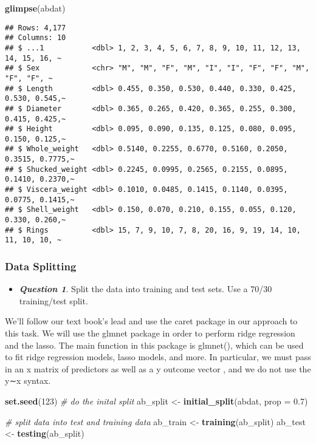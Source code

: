 \documentclass[
]{article}
\newenvironment{Shaded}{\begin{snugshade}}{\end{snugshade}}
\newcommand{\AttributeTok}[1]{\textcolor[rgb]{0.13,0.29,0.53}{#1}}
\newcommand{\CommentTok}[1]{\textcolor[rgb]{0.56,0.35,0.01}{\textit{#1}}}
\newcommand{\DecValTok}[1]{\textcolor[rgb]{0.00,0.00,0.81}{#1}}
\newcommand{\FloatTok}[1]{\textcolor[rgb]{0.00,0.00,0.81}{#1}}
\newcommand{\FunctionTok}[1]{\textcolor[rgb]{0.13,0.29,0.53}{\textbf{#1}}}
\newcommand{\NormalTok}[1]{#1}
\newcommand{\OtherTok}[1]{\textcolor[rgb]{0.56,0.35,0.01}{#1}}
\providecommand{\tightlist}{%
  \setlength{\itemsep}{0pt}\setlength{\parskip}{0pt}}
\begin{document}
\begin{Shaded}
\begin{Highlighting}[]
\FunctionTok{glimpse}\NormalTok{(abdat)}
\end{Highlighting}
\end{Shaded}

\begin{verbatim}
## Rows: 4,177
## Columns: 10
## $ ...1           <dbl> 1, 2, 3, 4, 5, 6, 7, 8, 9, 10, 11, 12, 13, 14, 15, 16, ~
## $ Sex            <chr> "M", "M", "F", "M", "I", "I", "F", "F", "M", "F", "F", ~
## $ Length         <dbl> 0.455, 0.350, 0.530, 0.440, 0.330, 0.425, 0.530, 0.545,~
## $ Diameter       <dbl> 0.365, 0.265, 0.420, 0.365, 0.255, 0.300, 0.415, 0.425,~
## $ Height         <dbl> 0.095, 0.090, 0.135, 0.125, 0.080, 0.095, 0.150, 0.125,~
## $ Whole_weight   <dbl> 0.5140, 0.2255, 0.6770, 0.5160, 0.2050, 0.3515, 0.7775,~
## $ Shucked_weight <dbl> 0.2245, 0.0995, 0.2565, 0.2155, 0.0895, 0.1410, 0.2370,~
## $ Viscera_weight <dbl> 0.1010, 0.0485, 0.1415, 0.1140, 0.0395, 0.0775, 0.1415,~
## $ Shell_weight   <dbl> 0.150, 0.070, 0.210, 0.155, 0.055, 0.120, 0.330, 0.260,~
## $ Rings          <dbl> 15, 7, 9, 10, 7, 8, 20, 16, 9, 19, 14, 10, 11, 10, 10, ~
\end{verbatim}

\hypertarget{data-splitting}{%
\subsubsection{Data Splitting}\label{data-splitting}}

\begin{itemize}
\tightlist
\item
  \textbf{\emph{Question 1}}. Split the data into training and test
  sets. Use a 70/30 training/test split.
\end{itemize}

We'll follow our text book's lead and use the caret package in our
approach to this task. We will use the glmnet package in order to
perform ridge regression and the lasso. The main function in this
package is glmnet(), which can be used to fit ridge regression models,
lasso models, and more. In particular, we must pass in an x matrix of
predictors as well as a y outcome vector , and we do not use the y∼x
syntax.

\begin{Shaded}
\begin{Highlighting}[]
\FunctionTok{set.seed}\NormalTok{(}\DecValTok{123}\NormalTok{)}
\CommentTok{\# do the inital split}
\NormalTok{ab\_split }\OtherTok{\textless{}{-}} \FunctionTok{initial\_split}\NormalTok{(abdat,}
                          \AttributeTok{prop =} \FloatTok{0.7}\NormalTok{)}

\CommentTok{\# split data into test and training data }
\NormalTok{ab\_train }\OtherTok{\textless{}{-}} \FunctionTok{training}\NormalTok{(ab\_split)}
\NormalTok{ab\_test }\OtherTok{\textless{}{-}} \FunctionTok{testing}\NormalTok{(ab\_split)}
\end{Highlighting}
\end{Shaded}
\end{document}
